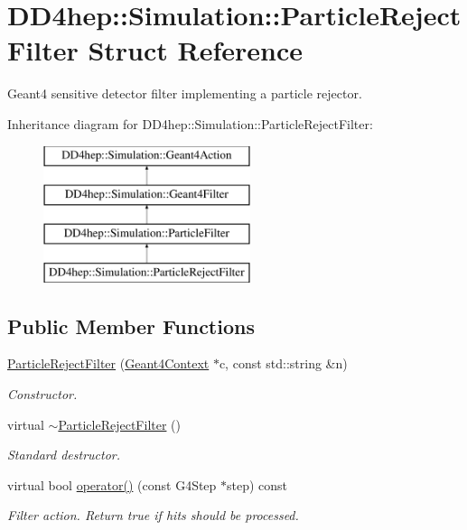 \hypertarget{struct_d_d4hep_1_1_simulation_1_1_particle_reject_filter}{}\section{D\+D4hep\+:\+:Simulation\+:\+:Particle\+Reject\+Filter Struct Reference}
\label{struct_d_d4hep_1_1_simulation_1_1_particle_reject_filter}


Geant4 sensitive detector filter implementing a particle rejector.  


Inheritance diagram for D\+D4hep\+:\+:Simulation\+:\+:Particle\+Reject\+Filter\+:\begin{figure}[H]
\begin{center}
\leavevmode
\includegraphics[height=4.000000cm]{struct_d_d4hep_1_1_simulation_1_1_particle_reject_filter}
\end{center}
\end{figure}
\subsection*{Public Member Functions}
\begin{DoxyCompactItemize}
\item 
\hyperlink{struct_d_d4hep_1_1_simulation_1_1_particle_reject_filter_aa06fb54a0ef772c1de13df2c32942adb}{Particle\+Reject\+Filter} (\hyperlink{class_d_d4hep_1_1_simulation_1_1_geant4_context}{Geant4\+Context} $\ast$c, const std\+::string \&n)
\begin{DoxyCompactList}\small\item\em Constructor. \end{DoxyCompactList}\item 
virtual \hyperlink{struct_d_d4hep_1_1_simulation_1_1_particle_reject_filter_a3e870813c0699826fd9e01deab351ba8}{$\sim$\+Particle\+Reject\+Filter} ()
\begin{DoxyCompactList}\small\item\em Standard destructor. \end{DoxyCompactList}\item 
virtual bool \hyperlink{struct_d_d4hep_1_1_simulation_1_1_particle_reject_filter_a3bf0977c00e9d94b45a1c2e0cb47448d}{operator()} (const G4\+Step $\ast$step) const
\begin{DoxyCompactList}\small\item\em Filter action. Return true if hits should be processed. \end{DoxyCompactList}\end{DoxyCompactItemize}
